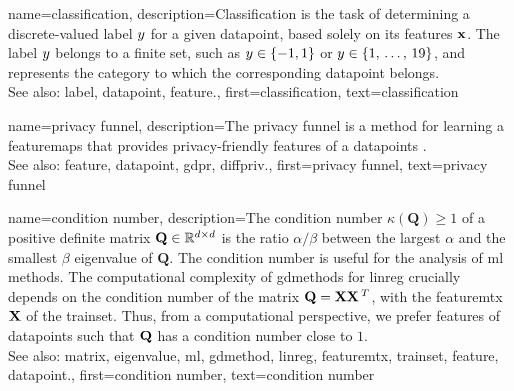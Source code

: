 {name={classification},
	description={Classification is the task of determining a 
 		discrete-valued \gls{label} $y$ for a given \gls{datapoint}, based solely on its 
 		\glspl{feature} ${\bf x}$. The \gls{label} $y$ belongs to a finite set, such as 
 		$y \in \{-1,1\}$ or $y \in \{1, \,\ldots, \,19\}$, and represents the 
 		category to which the corresponding \gls{datapoint} belongs.
				\\ 
		See also: \gls{label}, \gls{datapoint}, \gls{feature}.},
	first={classification},
	text={classification} 
}


{name={privacy funnel},
	description={The privacy funnel is a method for learning 
	a \glspl{featuremap} that provides privacy-friendly \glspl{feature} of a 
	\glspl{datapoint} \cite{PrivacyFunnel}.
				\\ 
		See also: \gls{feature}, \gls{datapoint}, \gls{gdpr}, \gls{diffpriv}.},
 	first={privacy funnel},
	text={privacy funnel} 
}


{name={condition number},
	description={The condition number $\kappa(\mathbf{Q}) \geq 1$ of a 
		positive definite \gls{matrix} $\mathbf{Q} \in \mathbb{R}^{d \times d}$ is the ratio 
		$\alpha /\beta  $ between the largest $\alpha$ and the smallest $\beta$ \gls{eigenvalue} of 
		$\mathbf{Q}$. The condition number is useful for the analysis of \gls{ml} methods. 
		The computational complexity of \glspl{gdmethod} for \gls{linreg} crucially depends on the 
		condition number of the \gls{matrix} $\mathbf{Q} = {\bf X} {\bf X}\,^{T}$, with the \gls{featuremtx} ${\bf X}$ 
		of the \gls{trainset}. Thus, from a computational perspective, we prefer \glspl{feature} of 
		\glspl{datapoint} such that $\mathbf{Q}$ has a condition number close to $1$.
					\\ 
		See also: \gls{matrix}, \gls{eigenvalue}, \gls{ml}, \gls{gdmethod}, \gls{linreg}, \gls{featuremtx}, \gls{trainset}, \gls{feature}, \gls{datapoint}.},
	first={condition number},
	text={condition number} 
}

